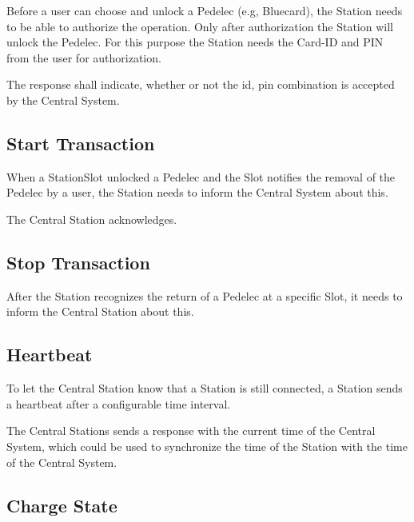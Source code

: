 Before a user can choose and unlock a Pedelec (e.g, Bluecard), the Station needs to be able to authorize the operation. Only after authorization the Station will unlock the Pedelec. For this purpose the Station needs the Card-ID and PIN from the user for authorization.

The response shall indicate, whether or not the id, pin combination is accepted by the Central System.

\subsection{Start Transaction}

When a StationSlot unlocked a Pedelec and the Slot notifies the removal of the Pedelec by a user, the Station needs to inform the Central System about this.

The Central Station acknowledges.

\subsection{Stop Transaction}

After the Station recognizes the return of a Pedelec at a specific Slot, it needs to inform the Central Station about this.

\subsection{Heartbeat}

To let the Central Station know that a Station is still connected, a Station sends a heartbeat after a configurable time interval.

The Central Stations sends a response with the current time of the Central System, which could be used to synchronize the time of the Station with the time of the Central System.

\subsection{Charge State}
